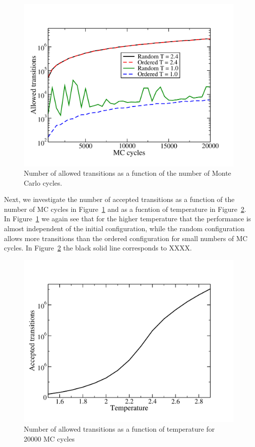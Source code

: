 \documentclass[prc,amsmath,twocolumn,superscriptaddress]{revtex4}
\begin{document}
\begin{figure}[t]
\includegraphics[scale=0.33]{config_mc.pdf}
\caption{Number of allowed transitions as a function of the number of Monte Carlo cycles.}
\label{config_mc}
\end{figure}

Next, we investigate the number of accepted transitions as a function of the number of MC cycles in Figure~\ref{config_mc} and as a fucntion of temperature in Figure~\ref{config_T}. In Figure~\ref{config_mc} we again see that for the higher temperature that the performance is almost independent of the initial configuration, while the random configuration allows more transitions than the ordered configuration for small numbers of MC cycles. In Figure~\ref{config_T} the black solid line corresponds to XXXX. 

\begin{figure}[b]
\includegraphics[scale=0.33]{config_T.pdf}
\caption{Number of allowed transitions as a function of temperature for 20000 MC cycles}
\label{config_T}
\end{figure}
\end{document}
